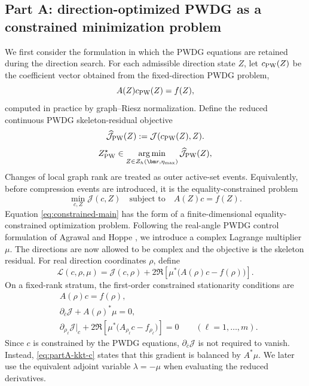 \documentclass[pdflatex,sn-mathphys-num]{sn-jnl}
\theoremstyle{thmstyleone}
\theoremstyle{thmstyletwo}
\begin{document}
\subsection{Part A: direction-optimized PWDG as a constrained minimization problem}\label{subsec:pwdg-constrained}
We first consider the formulation in which the PWDG equations are retained during the direction search.  For each admissible direction state $Z$, let $c_{\rm PW}(Z)$ be the coefficient vector obtained from the fixed-direction PWDG problem,
\begin{equation}\label{eq:cpw}
 A(Z)c_{\rm PW}(Z)=f(Z),
\end{equation}
computed in practice by graph--Riesz normalization.  Define the reduced continuous PWDG skeleton-residual objective
\begin{equation}\label{eq:Jpwdg}
 \widehat{\mathcal J}_{\rm PW}(Z)
 :=\mathcal J(c_{\rm PW}(Z),Z).
\end{equation}
\begin{equation}\label{eq:directionopt}
 Z_{\rm PW}^\star\in
 \operatorname*{arg\,min}_{Z\in\mathcal Z_h(\bm r,\eta_{\max})}
 \widehat{\mathcal J}_{\rm PW}(Z),
\end{equation}
Changes of local graph rank are treated as outer active-set events.  Equivalently, before compression events are introduced, it is the equality-constrained problem
\begin{equation}\label{eq:constrained-main}
 {
 \min_{c,Z}\mathcal J(c,Z)
 \quad\text{subject to}\quad A(Z)c=f(Z).}
\end{equation}
Equation \eqref{eq:constrained-main} has the form of a finite-dimensional equality-constrained optimization problem.  Following the real-angle PWDG control formulation of Agrawal and Hoppe \cite{AgrawalHoppe2017}, we introduce a complex Lagrange multiplier $\mu$.  The directions are now allowed to be complex and the objective is the skeleton residual.  For real direction coordinates $\rho$, define
\begin{equation}\label{eq:partA-lagrangian}
 \mathcal L(c,\rho,\mu)
 =\mathcal J(c,\rho)+2\Re\!\left[\mu^*\big(A(\rho)c-f(\rho)\big)\right].
\end{equation}
On a fixed-rank stratum, the first-order constrained stationarity conditions are
\begin{align}
 &A(\rho)c=f(\rho), \label{eq:partA-kkt-constraint}\\
 &\partial_{\bar c}\mathcal J+A(\rho)^*\mu=0, \label{eq:partA-kkt-c}\\
 &\partial_{\rho_\ell}\mathcal J\big|_c
 +2\Re\!\left[\mu^*\big(A_{\rho_\ell}c-f_{\rho_\ell}\big)\right]=0
 \qquad(\ell=1,\ldots,m). \label{eq:partA-kkt-rho}
\end{align}
Since $c$ is constrained by the PWDG equations, $\partial_{\bar c}\mathcal J$ is not required to vanish.  Instead, \eqref{eq:partA-kkt-c} states that this gradient is balanced by $A^*\mu$.  We later use the equivalent adjoint variable $\lambda=-\mu$ when evaluating the reduced derivatives.
\end{document}
